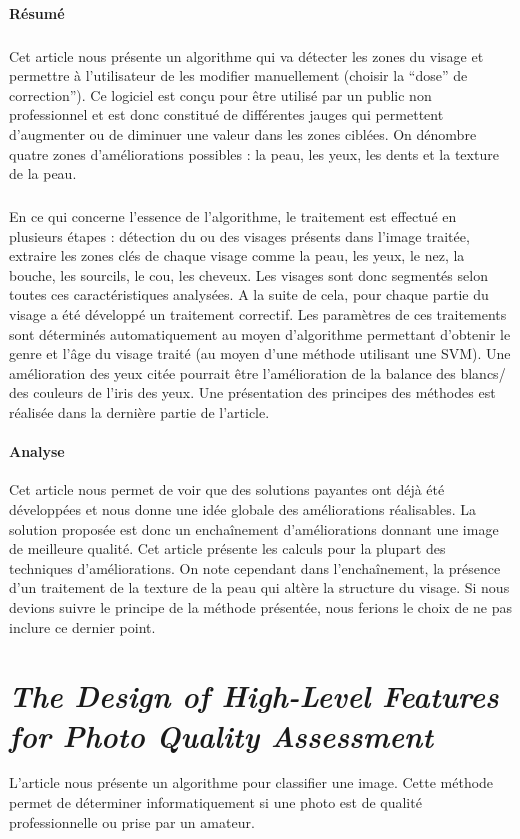 \documentclass[11pt, french,screen]{report-rd-info}
\begin{document}
\paragraph{Résumé}
\subparagraph{}
Cet article nous présente un algorithme qui va détecter les zones du visage et permettre à l'utilisateur de les modifier manuellement (choisir la “dose” de correction”). Ce logiciel est conçu pour être utilisé par un public non professionnel et est donc constitué de différentes jauges qui permettent d'augmenter ou de diminuer une valeur dans les zones ciblées. On dénombre quatre zones d'améliorations possibles : la peau, les yeux, les dents et la texture de la peau.
\subparagraph{}
En ce qui concerne l’essence de l’algorithme, le traitement est effectué en plusieurs étapes : détection du ou des visages présents dans l’image traitée, extraire les zones clés de chaque visage comme la peau, les yeux, le nez, la bouche, les sourcils, le cou, les cheveux. Les visages sont donc segmentés selon toutes ces caractéristiques analysées. A la suite de cela, pour chaque partie du visage a été développé un traitement correctif. Les paramètres de ces traitements sont déterminés automatiquement au moyen d’algorithme permettant d’obtenir le genre et l’âge du visage traité (au moyen d’une méthode utilisant une SVM).
Une amélioration des yeux citée pourrait être l’amélioration de la balance des blancs/ des couleurs de l’iris des yeux. Une présentation des principes des méthodes est réalisée dans la dernière partie de l’article.
\paragraph{Analyse}
Cet article nous permet de voir que des solutions payantes ont déjà été développées et nous donne une idée globale des améliorations réalisables. La solution proposée est donc un enchaînement d’améliorations donnant une image de meilleure qualité.
Cet article présente les calculs pour la plupart des techniques d’améliorations. On note cependant dans l'enchaînement, la présence d’un traitement de la texture de la peau qui altère la structure du visage. Si nous devions suivre le principe de la méthode présentée, nous ferions le choix de ne pas inclure ce dernier point.
\section{\emph{The Design of High-Level Features for Photo Quality Assessment}}
L'article \cite{Ke} nous présente un algorithme pour classifier une image. Cette méthode permet de déterminer informatiquement si une photo est de qualité professionnelle ou prise par un amateur.
\end{document}

